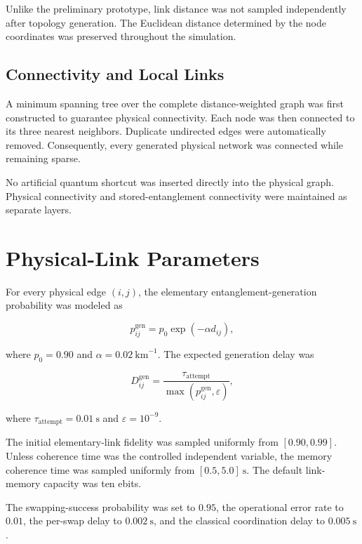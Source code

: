 Unlike the preliminary prototype, link distance was not sampled independently
after topology generation. The Euclidean distance determined by the node
coordinates was preserved throughout the simulation.

\subsection{Connectivity and Local Links}

A minimum spanning tree over the complete distance-weighted graph was first
constructed to guarantee physical connectivity. Each node was then connected to
its three nearest neighbors. Duplicate undirected edges were automatically
removed. Consequently, every generated physical network was connected while
remaining sparse.

No artificial quantum shortcut was inserted directly into the physical graph.
Physical connectivity and stored-entanglement connectivity were maintained as
separate layers.

\section{Physical-Link Parameters}

For every physical edge \((i,j)\), the elementary entanglement-generation
probability was modeled as

\begin{equation}
p_{ij}^{\mathrm{gen}}
=
p_0
\exp(-\alpha d_{ij}),
\end{equation}

where \(p_0=0.90\) and
\(\alpha=0.02~\mathrm{km}^{-1}\). The expected generation delay was

\begin{equation}
D_{ij}^{\mathrm{gen}}
=
\frac{\tau_{\mathrm{attempt}}}
{\max(p_{ij}^{\mathrm{gen}},\varepsilon)},
\end{equation}

where \(\tau_{\mathrm{attempt}}=0.01~\mathrm{s}\) and
\(\varepsilon=10^{-9}\).

The initial elementary-link fidelity was sampled uniformly from
\([0.90,0.99]\). Unless coherence time was the controlled independent variable,
the memory coherence time was sampled uniformly from
\([0.5,5.0]~\mathrm{s}\). The default link-memory capacity was ten ebits.

The swapping-success probability was set to \(0.95\), the operational error rate
to \(0.01\), the per-swap delay to \(0.002~\mathrm{s}\), and the classical
coordination delay to \(0.005~\mathrm{s}\).

